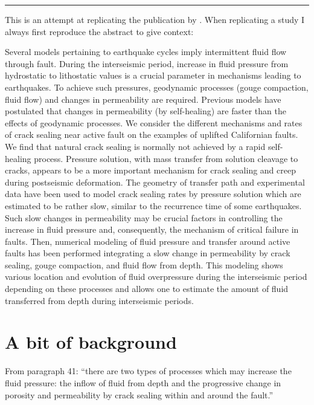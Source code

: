 \par\noindent\rule{\textwidth}{0.4pt}


This is an attempt at replicating the publication by .
When replicating a study I always first reproduce the abstract to give context:
\begin{displayquote}
{\color{darkgray}
Several models pertaining to earthquake cycles imply intermittent fluid flow through
fault. During the interseismic period, increase in fluid pressure from hydrostatic to
lithostatic values is a crucial parameter in mechanisms leading to earthquakes. To achieve
such pressures, geodynamic processes (gouge compaction, fluid flow) and changes in
permeability are required. Previous models have postulated that changes in permeability
(by self-healing) are faster than the effects of geodynamic processes. We consider the
different mechanisms and rates of crack sealing near active fault on the examples of
uplifted Californian faults. We find that natural crack sealing is normally not achieved by a
rapid self-healing process. Pressure solution, with mass transfer from solution cleavage to
cracks, appears to be a more important mechanism for crack sealing and creep during
postseismic deformation. The geometry of transfer path and experimental data have been
used to model crack sealing rates by pressure solution which are estimated to be rather
slow, similar to the recurrence time of some earthquakes. Such slow changes in
permeability may be crucial factors in controlling the increase in fluid pressure and,
consequently, the mechanism of critical failure in faults. Then, numerical modeling of
fluid pressure and transfer around active faults has been performed integrating a slow
change in permeability by crack sealing, gouge compaction, and fluid flow from depth.
This modeling shows various location and evolution of fluid overpressure during the
interseismic period depending on these processes and allows one to estimate the amount of
fluid transferred from depth during interseismic periods.
}
\end{displayquote}


\section*{A bit of background}

From paragraph 41: ``there are two types of processes
which may increase the fluid pressure: the inflow of fluid
from depth and the progressive change in porosity and
permeability by crack sealing within and around the fault.''


